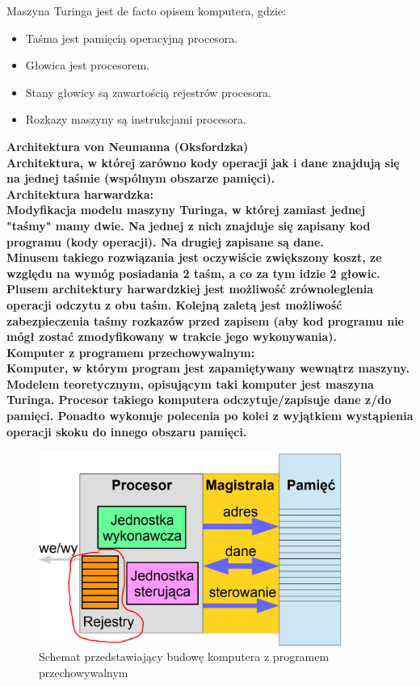 \documentclass[a4paper,12pt]{article}
\newcommand{\h}[1]{\noindent \bf #1 \rm \\ \noindent}
\begin{document}
\noindent
Maszyna Turinga jest de facto opisem komputera, gdzie:
\begin{itemize}
	\item Taśma jest pamięcią operacyjną procesora.
	\item Głowica jest procesorem.
	\item Stany głowicy są zawartością rejestrów procesora.
	\item Rozkazy maszyny są instrukcjami procesora.
\end{itemize}

\h{Architektura von Neumanna (Oksfordzka)}
Architektura, w której zarówno kody operacji jak i dane znajdują się na jednej taśmie (wspólnym obszarze pamięci).\\

\h{Architektura harwardzka:}
Modyfikacja modelu maszyny Turinga, w której zamiast jednej "taśmy" mamy dwie. Na jednej z nich znajduje się zapisany kod programu (kody operacji). Na drugiej zapisane są dane.\\

\noindent
Minusem takiego rozwiązania jest oczywiście zwiększony koszt, ze względu na wymóg posiadania 2 taśm, a co za tym idzie 2 głowic.\\

\noindent
Plusem architektury harwardzkiej jest możliwość zrównoleglenia operacji odczytu z obu taśm. Kolejną zaletą jest możliwość zabezpieczenia taśmy rozkazów przed zapisem (aby kod programu nie mógł zostać zmodyfikowany w trakcie jego wykonywania).\\

\h{Komputer z programem przechowywalnym:}
Komputer, w którym program jest zapamiętywany wewnątrz maszyny. Modelem teoretycznym, opisującym taki komputer jest maszyna Turinga. Procesor takiego komputera odczytuje/zapisuje dane z/do pamięci. Ponadto wykonuje polecenia po kolei z wyjątkiem wystąpienia operacji skoku do innego obszaru pamięci.\\

\begin{figure}[H]
	\centering
	\includegraphics[width=10cm]{fig1.png}
	\caption{Schemat przedstawiający budowę komputera z programem przechowywalnym}
	\label{fig.budowa}
\end{figure}
\end{document}
